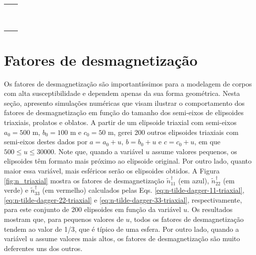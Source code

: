 \begin{table}[h!]
	\begin{center}
		\begin{tabular}{lc}
			
			& \\
			& \\
			& \\
			& \\
			& \\
			& \\
			& \\
			& \\
			& \\
			& \\
		\end{tabular}
	\end{center}
\end{table}

\section{Fatores de desmagnetização}

Os fatores de desmagnetização são importantíssimos para a modelagem de corpos com alta susceptibilidade e dependem apenas da sua forma geométrica. 
Nesta seção, apresento simulações numéricas que visam ilustrar o comportamento dos fatores de desmagnetização em função do tamanho dos semi-eixos de elipsoides triaxiais, prolatos e oblatos. A partir de um elipsoide triaxial com semi-eixos $a_0=500$ m, $b_0=100$ m e $c_0=50$ m, gerei 200 outros elipsoides triaxiais com semi-eixos destes dados por $a=a_0+u$, $b=b_0+u$ e $c=c_0+u$, em que $500 \le u \le 30000$. Note que, quando a variável $u$ assume valores pequenos, os elipsoides têm formato mais próximo ao elipsoide original. Por outro lado, quanto maior essa variável, mais esféricos serão os elipsoides obtidos. A Figura \ref{fig:n_triaxial} mostra os fatores de desmagnetização $\tilde{n}^{\dagger}_{11}$ (em azul), $\tilde{n}^{\dagger}_{22}$ (em verde) e $\tilde{n}^{\dagger}_{33}$ (em vermelho) calculados pelas Eqs. \ref{eq:n-tilde-dagger-11-triaxial}, \ref{eq:n-tilde-dagger-22-triaxial} e \ref{eq:n-tilde-dagger-33-triaxial}, respectivamente, para este conjunto de 200 elipsoides em função da variável $u$. Os resultados mostram que, para pequenos valores de $u$, todos os fatores de desmagnetização tendem ao valor de 1/3, que é típico de uma esfera. Por outro lado, quando a variável $u$ assume valores mais altos, os fatores de desmagnetização são muito deferentes uns dos outros.

